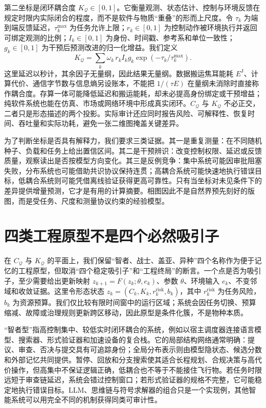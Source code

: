 第二坐标是闭环耦合度 $K_{\mathcal Q}\in[0,1]$。它衡量观测、状态估计、控制与环境反馈在规定时限内实际闭合的程度，而不是软件与物质“重叠”的形而上尺度。令 $\tau_k$ 为端到端反馈延迟，$\tau_k^{\max}$ 为任务允许上限；$r_k\in[0,1]$ 为控制动作被环境执行并返回可绑定观测的比例；$I_k\in[0,1]$ 为身份、时间戳、参考系和单位一致性；$g_k\in[0,1]$ 为干预后预测改进的归一化增益。我们定义
\[
K_{\mathcal Q}=\sum_k\omega_k\,r_k I_k g_k
\exp\!\left(-\tau_k/\tau_k^{\max}\right).
\]
这里延迟以秒计，其余因子无量纲，因此结果无量纲。数据搬运焦耳能耗 $E^{\mathrm{J}}$、计算代价、通信字节数与信息熵另设账本，不能把 $1/(\tau E)$ 在量纲未消除时直接称作耦合度。存算一体可能降低延迟和搬运能耗，却未必提高身份绑定或干预增益；纯软件系统也能在仿真、市场或网络环境中形成真实闭环。$C_{\mathcal Q}$ 与 $K_{\mathcal Q}$ 不必正交，二者只是形态描述的两个投影。实际审计还应同时报告风险、可解释性、恢复时间、吞吐量和实际功耗，避免一张二维图掩盖关键差异。

为了判断坐标是否具有解释力，我们要求三类证据。其一是重复测量：在不同随机种子、负载和任务上给出置信区间。其二是干预辨识：改变控制权限、延迟或反馈质量，观察读出是否按模型方向变化。其三是反例竞争：集中系统可能因审批阻塞失败，分布系统也可能借助共识协议保持连贯；高耦合系统可能快速地执行错误目标，低耦合系统则可能凭借离线验证获得更高可靠性。只有当坐标对未见条件下的差异提供增量预测，它才是有用的计算摘要。相图因此不是自然界预先刻好的版图，而是受任务、尺度和测量协议约束的经验模型。

\section{四类工程原型不是四个必然吸引子}
\label{sec:section_1225}

在 $C_{\mathcal Q}$ 与 $K_{\mathcal Q}$ 的平面上，我们保留“智者、战士、盖亚、异种”四个名称作为便于记忆的工程原型，但取消“四个稳定吸引子”和“工程终局”的断言。一个点是否为吸引子，至少需要给出更新映射 $z_{k+1}=F(z_k;\theta,e_k)$、参数 $\theta$、环境输入 $e_k$、不变邻域和收敛证据。这里令形态状态 $z_k=(C_k,K_k,r_k^{\mathrm{risk}},b_k)$，其中 $r_k^{\mathrm{risk}}$ 为任务风险，$b_k$ 为资源预算。我们仅比较有限时间窗中的运行区域；系统会因任务切换、预算缩减、故障或治理规则更新跨区移动，因此原型是条件化簇，不是物种本质。

“智者型”指高控制集中、较低实时闭环耦合的系统，例如以宿主调度器连接语言模型、搜索器、形式验证器和加速设备的复合栈。它的局部结构网络通常明确：提议、审查、否决与提交具有可追踪身份；全局分布表示则由模型隐状态、候选分数和外部记忆共同提供。暂停、回放和分支搜索使其适合长程规划、合规决策与高代价操作，但高集中不保证逻辑正确，低耦合也不等于不能接住飞行物。若任务时限远短于审查链延迟，系统会错过控制窗口；若形式验证器的规格不完整，它可能稳定地执行错误目标。LLM、思维链与符号求解器的组合只是一个实现例，其他智能系统可以用完全不同的机制获得同类可审计性。

